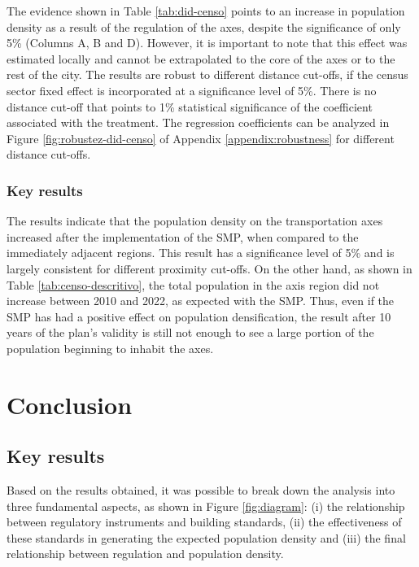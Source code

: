 

The evidence shown in Table \ref{tab:did-censo} points to an increase in population density as a result of the regulation of the axes, despite the significance of only 5\% (Columns A, B and D). However, it is important to note that this effect was estimated locally and cannot be extrapolated to the core of the axes or to the rest of the city. The results are robust to different distance cut-offs, if the census sector fixed effect is incorporated at a significance level of 5\%. There is no distance cut-off that points to 1\% statistical significance of the coefficient associated with the treatment. The regression coefficients can be analyzed in Figure \ref{fig:robustez-did-censo} of Appendix \ref{appendix:robustness} for different distance cut-offs.

\subsection{Key results}


The results indicate that the population density on the transportation axes increased after the implementation of the SMP, when compared to the immediately adjacent regions. This result has a significance level of 5\% and is largely consistent for different proximity cut-offs. On the other hand, as shown in Table \ref{tab:censo-descritivo}, the total population in the axis region did not increase between 2010 and 2022, as expected with the SMP. Thus, even if the SMP has had a positive effect on population densification, the result after 10 years of the plan's validity is still not enough to see a large portion of the population beginning to inhabit the axes.


\chapter{Conclusion}
\label{chp:conclusion}

\section{Key results}
\label{sec:conclusion}

Based on the results obtained, it was possible to break down the analysis into three fundamental aspects, as shown in Figure \ref{fig:diagram}: (i) the relationship between regulatory instruments and building standards, (ii) the effectiveness of these standards in generating the expected population density and (iii) the final relationship between regulation and population density.

